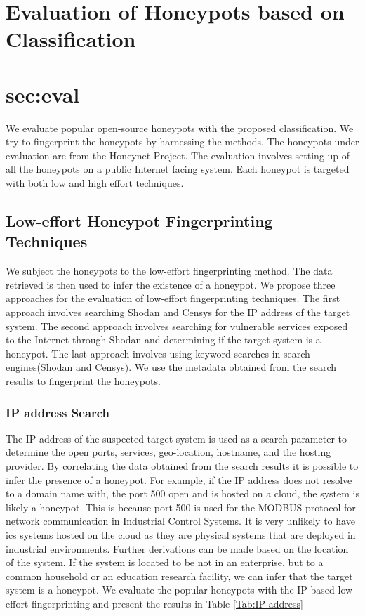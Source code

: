 \section{Evaluation of Honeypots based on Classification}
\section{sec:eval}

We evaluate popular open-source honeypots with the proposed classification. We try to fingerprint the honeypots by harnessing the methods. The honeypots under evaluation are from the Honeynet Project. The evaluation involves setting up of all the honeypots on a public Internet facing system. Each honeypot is targeted with both low and high effort techniques. 
 
\subsection{Low-effort Honeypot Fingerprinting Techniques}
 We subject the honeypots to the low-effort fingerprinting method. The data retrieved is then used to infer the existence of a honeypot. We propose three approaches for the evaluation of low-effort fingerprinting techniques. The first approach involves searching Shodan and Censys for the IP address of the target system. The second approach involves searching for vulnerable services exposed to the Internet through Shodan and determining if the target system is a honeypot. The last approach involves using keyword searches in search engines(Shodan and Censys). We use the metadata obtained from the search results to fingerprint the honeypots. 
 
 \subsubsection{IP address Search}
The IP address of the suspected target system is used as a search parameter to determine the open ports, services, geo-location, hostname, and the hosting provider. By correlating the data obtained from the search results it is possible to infer the presence of a honeypot. For example, if the IP address does not resolve to a domain name with, the port 500 open and is hosted on a cloud, the system is likely a honeypot. This is because port 500 is used for the MODBUS protocol for network communication in Industrial Control Systems. It is very unlikely to have \acrshort{ics} systems hosted on the cloud as they are physical systems that are deployed in industrial environments.  Further derivations can be made based on the location of the system. If the system is located to be not in an enterprise, but to a common household or an education research facility, we can infer that the target system is a honeypot. We  evaluate the popular honeypots with the IP based low effort fingerprinting and present the results in Table \ref{Tab:IP address}

